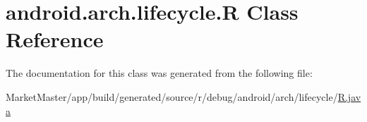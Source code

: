 \hypertarget{classandroid_1_1arch_1_1lifecycle_1_1R}{}\section{android.\+arch.\+lifecycle.\+R Class Reference}
\label{classandroid_1_1arch_1_1lifecycle_1_1R}


The documentation for this class was generated from the following file\+:\begin{DoxyCompactItemize}
\item 
Market\+Master/app/build/generated/source/r/debug/android/arch/lifecycle/\mbox{\hyperlink{debug_2android_2arch_2lifecycle_2R_8java}{R.\+java}}\end{DoxyCompactItemize}
